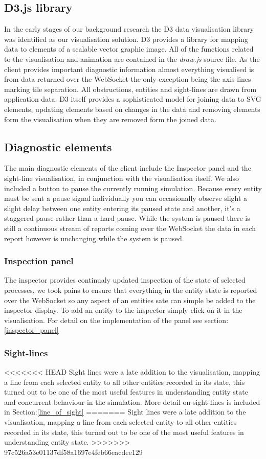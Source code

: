 \subsection{D3.js library}
In the early stages of our background research the D3 data visualisation library was identified as our visualisation solution. D3 provides a library for mapping data to elements of a scalable vector graphic image. All of the functions related to the visualisation and animation are contained in the \emph{draw.js} source file. As the client provides important diagnostic information almost everything visualised is from data returned over the WebSocket the only exception being the axis lines marking tile separation. All obstructions, entities and sight-lines are drawn from application data.
D3 itself provides a sophisticated model for joining data to SVG elements, updating elements based on changes in the data and removing elements form the visualisation when they are removed form the joined data.
\subsection{Diagnostic elements}
The main diagnostic elements of the client include the Inspector panel and the sight-line visualisation, in conjunction with the visualisation itself. We also included a button to pause the currently running simulation. Because every entity must be sent a pause signal individually you can occasionally observe slight a slight delay between one entity entering its paused state and another, it's a staggered pause rather than a hard pause. While the system is paused there is still a continuous stream of reports coming over the WebSocket the data in each report however is unchanging while the system is paused.
\subsubsection{Inspection panel}
The inspector provides continualy updated inspection of the state of selected processes, we took pains to ensure that everything in the entity state is reported over the WebSocket so any aspect of an entities sate can simple be added to the inspector display. To add an entity to the inspector simply click on it in the visualisation. For detail on the implementation of the panel see section:\ref{inspector_panel}
\subsubsection{Sight-lines}
<<<<<<< HEAD
\label{sight_lines}
Sight lines were a late addition to the visualisation, mapping a line from each selected entity to all other entities recorded in its state, this turned out to be one of the most useful features in understanding entity state and concurrent behaviour in the simulation. More detail on sight-lines is included in Section:\ref{line_of_sight} 
=======
Sight lines were a late addition to the visualisation, mapping a line from each selected entity to all other entities recorded in its state, this turned out to be one of the most useful features in understanding entity state.
>>>>>>> 97c526a53e01137df58a1697e4feb66eacdee129

\clearpage
\endinput
